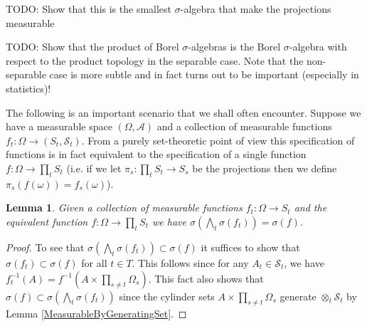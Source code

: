 \documentclass{amsart}
\newtheorem{lem}[thm]{Lemma}
\theoremstyle{remark}
\theoremstyle{definition}
\begin{document}
TODO: Show that this is the smallest $\sigma$-algebra that make the
projections measurable

TODO: Show that the product of Borel $\sigma$-algebras is the Borel
$\sigma$-algebra with respect to the product topology in the separable
case.  Note that the non-separable case is more subtle and in fact
turns out to be important (especially in statistics)!

The following is an important scenario that we shall often encounter.
Suppose we have a measurable space $(\Omega, \mathcal{A})$ and a
collection of measurable functions $f_t : \Omega \to (S_t,
\mathcal{S}_t)$.  From a purely set-theoretic point of view this
specification of functions is in fact
equivalent to the specification of a single function $f : \Omega \to
\prod_t S_t$ (i.e. if we let $\pi_s : \prod_t S_t \to S_s$ be the
projections then we define $\pi_s(f(\omega)) = f_s(\omega)$).  

\begin{lem}Given a collection of measurable functions $f_t : \Omega
  \to S_t$ and the equivalent function $f : \Omega \to \prod_t S_t$ we
  have $\sigma(\bigwedge_t \sigma(f_t)) = \sigma(f)$.
\end{lem}
\begin{proof}
To see that $\sigma(\bigwedge_t \sigma(f_t)) \subset \sigma(f)$ it
suffices to show that $\sigma(f_t) \subset \sigma(f)$ for all $t \in
T$.  This follows since for any $A_t \in \mathcal{S}_t$, we have
$f_t^{-1}(A) = f^{-1}(A \times  \prod_{s \neq t} \Omega_s)$.  This
fact also shows that $\sigma(f) \subset \sigma(\bigwedge_t
\sigma(f_t))$ since the cylinder sets $A \times  \prod_{s \neq t}
\Omega_s$ generate $\otimes_t \mathcal{S}_t$ by Lemma \ref{MeasurableByGeneratingSet}.
\end{proof}
\end{document}
